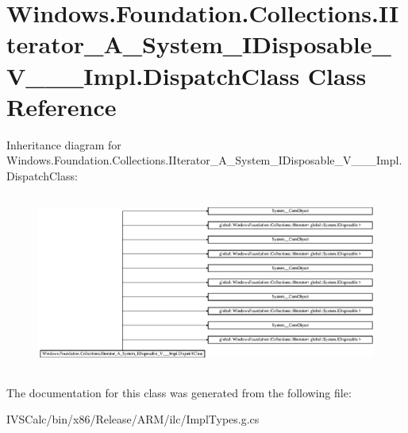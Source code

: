 \hypertarget{class_windows_1_1_foundation_1_1_collections_1_1_i_iterator___a___system___i_disposable___v_______impl_1_1_dispatch_class}{}\section{Windows.\+Foundation.\+Collections.\+I\+Iterator\+\_\+\+A\+\_\+\+System\+\_\+\+I\+Disposable\+\_\+\+V\+\_\+\+\_\+\+\_\+\+Impl.\+Dispatch\+Class Class Reference}
\label{class_windows_1_1_foundation_1_1_collections_1_1_i_iterator___a___system___i_disposable___v_______impl_1_1_dispatch_class}
Inheritance diagram for Windows.\+Foundation.\+Collections.\+I\+Iterator\+\_\+\+A\+\_\+\+System\+\_\+\+I\+Disposable\+\_\+\+V\+\_\+\+\_\+\+\_\+\+Impl.\+Dispatch\+Class\+:\begin{figure}[H]
\begin{center}
\leavevmode
\includegraphics[height=5.833333cm]{class_windows_1_1_foundation_1_1_collections_1_1_i_iterator___a___system___i_disposable___v_______impl_1_1_dispatch_class}
\end{center}
\end{figure}


The documentation for this class was generated from the following file\+:\begin{DoxyCompactItemize}
\item 
I\+V\+S\+Calc/bin/x86/\+Release/\+A\+R\+M/ilc/Impl\+Types.\+g.\+cs\end{DoxyCompactItemize}
